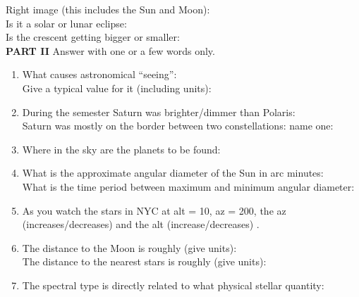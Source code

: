 \documentclass[11pt]{article}
\begin{document}
Right image (this includes the Sun and Moon): \\
Is it a solar or lunar eclipse: \makebox[3cm]{\hrulefill} \\
Is the crescent getting bigger or smaller: \makebox[3cm]{\hrulefill} \\

 
\clearpage
\newpage
{\bf PART II} Answer with one or a few words only.

\begin{enumerate}

\item
What causes astronomical ``seeing'': \makebox[3cm]{\hrulefill}\\
Give a typical value for it (including units):  \makebox[3cm]{\hrulefill}

\vspace{0.5cm}
\item
During the semester Saturn was brighter/dimmer than Polaris:
\makebox[3cm]{\hrulefill} \\
Saturn was mostly on the border between two constellations: name one:
\makebox[3cm]{\hrulefill}  

\vspace{0.5cm}
\item 
Where in the sky are the planets to be found: \makebox[3cm]{\hrulefill}

\vspace{0.5cm}
\item 
What is the approximate angular diameter of the Sun in arc minutes:
  \makebox[3cm]{\hrulefill} \\ What is the time period between 
  maximum and minimum angular diameter: \makebox[3cm]{\hrulefill}

\vspace{0.5cm}
\item 
As you watch the stars  in NYC at alt = 10\deg, az = 200\deg, the az
(increases/decreases)  \makebox[3cm]{\hrulefill} and the alt
(increase/decreases)  \makebox[3cm]{\hrulefill}. 

\vspace{0.5cm}
\item
The distance to the Moon is roughly (give units):
\makebox[3cm]{\hrulefill} \\
The distance to the nearest stars is roughly (give units):
\makebox[3cm]{\hrulefill} 

\vspace{0.5cm}
\item
The spectral type is directly related to what physical stellar
quantity: \makebox[3cm]{\hrulefill} 


\end{enumerate}
\end{document}
